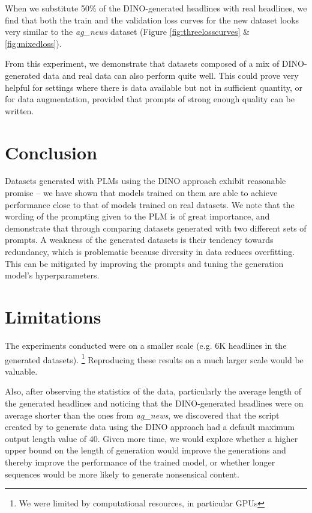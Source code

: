 \documentclass[11pt]{article}
\begin{document}
When we substitute 50\% of the DINO-generated headlines with real headlines, we find that both the train and the validation loss curves for the new dataset looks very similar to the \textit{ag\_news} dataset (Figure \ref{fig:threelosscurves} \& \ref{fig:mixedloss}).

From this experiment, we demonstrate that datasets composed of a mix of DINO-generated data and real data can also perform quite well. This could prove very helpful for settings where there is data available but not in sufficient quantity, or for data augmentation, provided that prompts of strong enough quality can be written.


\section{Conclusion}

Datasets generated with PLMs using the DINO approach exhibit reasonable promise -- we have shown that models trained on them are able to achieve performance close to that of models trained on real datasets. We note that the wording of the prompting given to the PLM is of great importance, and demonstrate that through comparing datasets generated with two different sets of prompts. A weakness of the generated datasets is their tendency towards redundancy, which is problematic because diversity in data reduces overfitting. This can be mitigated by improving the prompts and tuning the generation model's hyperparameters.




\section*{Limitations}

The experiments conducted were on a smaller scale (e.g. 6K headlines in the generated datasets). \footnote{We were limited by computational resources, in particular GPUs} Reproducing these results on a much larger scale would be valuable.

Also, after observing the statistics of the data, particularly the average length of the generated headlines and noticing that the DINO-generated headlines were on average shorter than the ones from \textit{ag\_news}, we discovered that the script created by \citet{schick2021generating} to generate data using the DINO approach had a default maximum output length value of 40. Given more time, we would explore whether a higher upper bound on the length of generation would improve the generations and thereby improve the performance of the trained model, or whether longer sequences would be more likely to generate nonsensical content.
\end{document}
